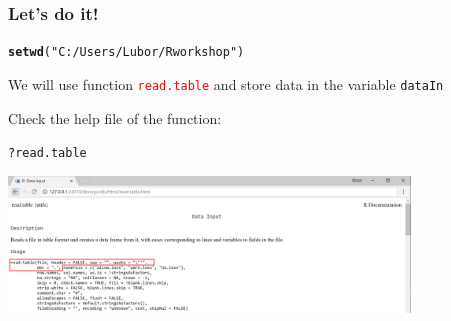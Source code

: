\documentclass[12pt]{beamer}\usepackage[]{graphicx}\usepackage[]{color}
\makeatletter
\newcommand{\hlstr}[1]{\textcolor[rgb]{0.192,0.494,0.8}{#1}}%
\newcommand{\hlopt}[1]{\textcolor[rgb]{0,0,0}{#1}}%
\newcommand{\hlstd}[1]{\textcolor[rgb]{0.345,0.345,0.345}{#1}}%
\newcommand{\hlkwd}[1]{\textcolor[rgb]{0.737,0.353,0.396}{\textbf{#1}}}%
\newenvironment{kframe}{%
 \def\at@end@of@kframe{}%
 \ifinner\ifhmode%
  \def\at@end@of@kframe{\end{minipage}}%
  \begin{minipage}{\columnwidth}%
 \fi\fi%
 \def\FrameCommand##1{\hskip\@totalleftmargin \hskip-\fboxsep
 \colorbox{shadecolor}{##1}\hskip-\fboxsep
     \hskip-\linewidth \hskip-\@totalleftmargin \hskip\columnwidth}%
 \MakeFramed {\advance\hsize-\width
   \@totalleftmargin\z@ \linewidth\hsize
   \@setminipage}}%
 {\par\unskip\endMakeFramed%
 \at@end@of@kframe}
\newenvironment{knitrout}{}{} %
\makeatother
\begin{document}
\begin{frame}[fragile]
\frametitle{Let's do it!}

\begin{knitrout}
\color{fgcolor}\begin{kframe}
\begin{alltt}
\hlkwd{setwd}\hlstd{(}\hlstr{"C:/Users/Lubor/Rworkshop"}\hlstd{)}
\end{alltt}
\end{kframe}
\end{knitrout}

We will use function \textcolor{red}{\texttt{read.table}} and store data in the variable \texttt{dataIn} 

Check the help file of the function:
\begin{knitrout}
\color{fgcolor}\begin{kframe}
\begin{alltt}
\hlopt{?}\hlstd{read.table}
\end{alltt}
\end{kframe}
\end{knitrout}
 \centering\includegraphics[width=0.8\textwidth,height=0.8\textheight,keepaspectratio]{./Images/07_readTable}

\end{frame}

\end{document}
